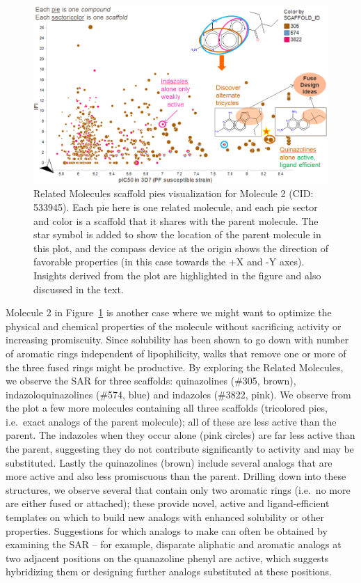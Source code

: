 \documentclass[journal=jacsat,manuscript=article]{achemso}
\newcommand*\fref[1]{Figure~\ref{fig:#1}}
\newcommand*\ie{i.e.~}
\begin{document}
\begin{figure}
\includegraphics[width=6in]{fig/mol2_RGtool_scafpie2.png}
\caption{Related Molecules scaffold pies visualization for Molecule 2 (CID: 533945). Each pie here is one related molecule, and each pie sector and color is a scaffold that it shares with the parent molecule. The star symbol is added to show the location of the parent molecule in this plot, and the compass device at the origin shows the direction of favorable properties (in this case towards the +X and -Y axes). Insights derived from the plot are highlighted in the figure and also discussed in the text.}
\label{fig:scafwalk2}
\end{figure}

Molecule 2 in \fref{scafwalk2} is another case where we might want to optimize the physical and chemical properties of the molecule without sacrificing activity or increasing promiscuity. Since solubility has been shown to go down with number of aromatic rings independent of lipophilicity\cite{Hill2010}, walks that remove one or more of the three fused rings might be productive. By exploring the Related Molecules, we observe the SAR for three scaffolds: quinazolines (\#305, brown), indazoloquinazolines (\#574, blue) and indazoles (\#3822, pink). We observe from the plot a few more molecules containing all three scaffolds (tricolored pies, \ie exact analogs of the parent molecule); all of these are less active than the parent. The indazoles when they occur alone (pink circles) are far less active than the parent, suggesting they do not contribute significantly to activity and may be substituted. Lastly the quinazolines (brown) include several analogs that are more active and also less promiscuous than the parent. Drilling down into these structures, we observe several that contain only two aromatic rings (\ie no more are either fused or attached); these provide novel, active and ligand-efficient templates on which to build new analogs with enhanced solubility or other properties. Suggestions for which analogs to make can often be obtained by examining the SAR -- for example, disparate aliphatic and aromatic analogs at two adjacent positions on the quanazoline phenyl are active, which suggests hybridizing them or designing further analogs substituted at these positions.
\end{document}
